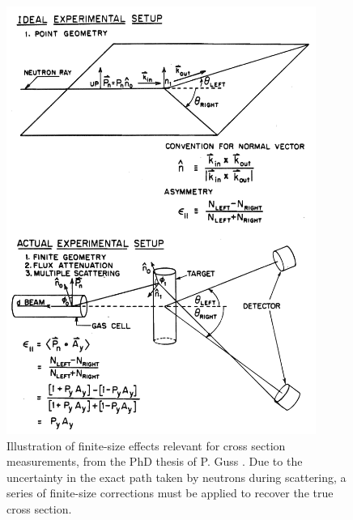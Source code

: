 \begin{figure}[ht!]
    \centering
        \includegraphics[width = 0.9\textwidth]{figures/GussFiniteSizeDiagram.png}
        \caption[Illustration of finite-size effects relevant for \el cross
        section measurements]
        {
            Illustration of finite-size effects relevant for \el cross
            section measurements, from the PhD thesis of P. Guss
            \cite{GussPhDThesis}. Due to the uncertainty in the exact path taken
            by neutrons during scattering, a series of finite-size corrections
            must be applied to recover the true cross section.
        }
        \label{GussFiniteSizeDiagram}
\end{figure}


